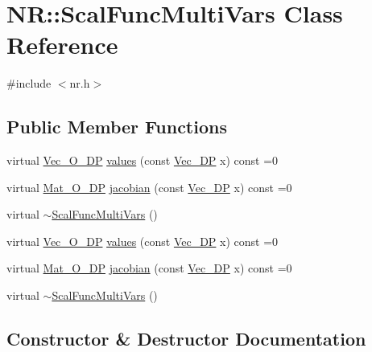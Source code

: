 \hypertarget{classNR_1_1ScalFuncMultiVars}{}\section{NR\+:\+:Scal\+Func\+Multi\+Vars Class Reference}
\label{classNR_1_1ScalFuncMultiVars}


{\ttfamily \#include $<$nr.\+h$>$}

\subsection*{Public Member Functions}
\begin{DoxyCompactItemize}
\item 
virtual \mbox{\hyperlink{namespaceNR_a970094d23441f8ef6a45282a7eb2103d}{Vec\+\_\+\+O\+\_\+\+DP}} \mbox{\hyperlink{classNR_1_1ScalFuncMultiVars_a5345ed027a649e71ae8ae3c8dadb436c}{values}} (const \mbox{\hyperlink{namespaceNR_a115a3196718c98e8e2562d80b06c23c5}{Vec\+\_\+\+DP}} x) const =0
\item 
virtual \mbox{\hyperlink{namespaceNR_adc1f8da33094b6bbeb1f5f899515ce54}{Mat\+\_\+\+O\+\_\+\+DP}} \mbox{\hyperlink{classNR_1_1ScalFuncMultiVars_ab8dd80ced0a7b26584bde4e34444c04a}{jacobian}} (const \mbox{\hyperlink{namespaceNR_a115a3196718c98e8e2562d80b06c23c5}{Vec\+\_\+\+DP}} x) const =0
\item 
virtual \mbox{\hyperlink{classNR_1_1ScalFuncMultiVars_a324caa9cf6de53c9eb1f532443030188}{$\sim$\+Scal\+Func\+Multi\+Vars}} ()
\item 
virtual \mbox{\hyperlink{namespaceNR_a970094d23441f8ef6a45282a7eb2103d}{Vec\+\_\+\+O\+\_\+\+DP}} \mbox{\hyperlink{classNR_1_1ScalFuncMultiVars_a5345ed027a649e71ae8ae3c8dadb436c}{values}} (const \mbox{\hyperlink{namespaceNR_a115a3196718c98e8e2562d80b06c23c5}{Vec\+\_\+\+DP}} x) const =0
\item 
virtual \mbox{\hyperlink{namespaceNR_adc1f8da33094b6bbeb1f5f899515ce54}{Mat\+\_\+\+O\+\_\+\+DP}} \mbox{\hyperlink{classNR_1_1ScalFuncMultiVars_ab8dd80ced0a7b26584bde4e34444c04a}{jacobian}} (const \mbox{\hyperlink{namespaceNR_a115a3196718c98e8e2562d80b06c23c5}{Vec\+\_\+\+DP}} x) const =0
\item 
virtual \mbox{\hyperlink{classNR_1_1ScalFuncMultiVars_a324caa9cf6de53c9eb1f532443030188}{$\sim$\+Scal\+Func\+Multi\+Vars}} ()
\end{DoxyCompactItemize}


\subsection{Constructor \& Destructor Documentation}
\mbox{\label{classNR_1_1ScalFuncMultiVars_a324caa9cf6de53c9eb1f532443030188}} 
